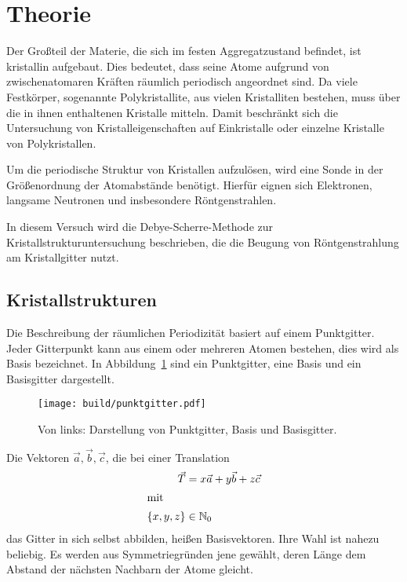 \section{Theorie}\label{sec:Theorie}
\nocite{anleitung}

Der Großteil der Materie, die sich im festen Aggregatzustand befindet,
ist kristallin aufgebaut.
Dies bedeutet, dass seine Atome aufgrund von zwischenatomaren Kräften räumlich periodisch angeordnet sind.
Da viele Festkörper, sogenannte Polykristallite, aus vielen Kristalliten bestehen,
muss über die in ihnen enthaltenen Kristalle mitteln.
Damit beschränkt sich die
Untersuchung von Kristalleigenschaften auf Einkristalle oder einzelne Kristalle
von Polykristallen.

Um die periodische Struktur von Kristallen aufzulösen, wird eine Sonde in der
Größenordnung der Atomabstände benötigt.
Hierfür eignen sich Elektronen, langsame Neutronen und insbesondere Röntgenstrahlen.

In diesem Versuch wird die Debye-Scherre-Methode zur Kristallstrukturuntersuchung beschrieben,
die die Beugung von Röntgenstrahlung am Kristallgitter nutzt.

\subsection{Kristallstrukturen}%
\label{sub:kristallstrukturen}
Die Beschreibung der räumlichen Periodizität basiert auf einem Punktgitter.
Jeder Gitterpunkt kann aus einem oder mehreren Atomen bestehen,
dies wird als Basis bezeichnet.
In Abbildung~\ref{fig:punktgitter} sind ein Punktgitter, eine Basis und ein Basisgitter
dargestellt.
\begin{figure}
  \centering
  \texttt{[image: build/punktgitter.pdf]}
  \caption{Von links: Darstellung von Punktgitter, Basis und Basisgitter.\cite{anleitung}}%
  \label{fig:punktgitter}
\end{figure}

Die Vektoren $\vec{a}, \vec{b}, \vec{c}$, die bei einer Translation
\begin{align}
  \vec{T} &= x\vec{a} + y\vec{b} + z\vec{c} \\
  \intertext{mit}
  \left\{x, y, z\right\} &\in \mathbb{N}_0
\end{align}
das Gitter in sich selbst abbilden, heißen Basisvektoren.
Ihre Wahl ist nahezu beliebig.
Es werden aus Symmetriegründen jene gewählt,
deren Länge dem Abstand der nächsten Nachbarn der Atome gleicht.

